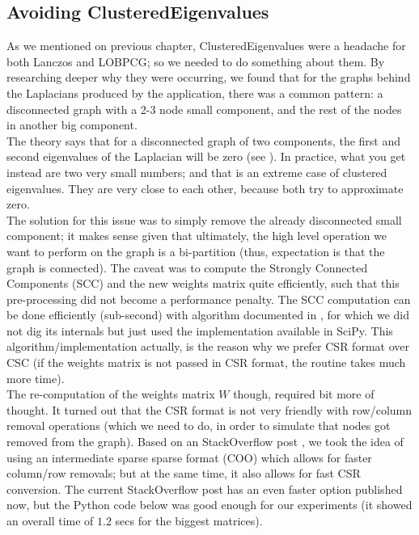 \subsection{Avoiding \gls{ClusteredEigenvalues}}
\label{sub:avoid-clust-eigv}

As we mentioned on previous chapter, \gls{ClusteredEigenvalues} were a
headache for both Lanczos and LOBPCG; so we needed to do something
about them. By researching deeper why they were occurring, we found
that for the graphs behind the \gls{Laplacian}s produced by the
application, there was a common pattern: a disconnected graph with a
2-3 node small component, and the rest of the nodes in another big
component. \\

The theory says that for a disconnected graph of two components, the
first and second eigenvalues of the \gls{Laplacian} will be zero (see
\cite{luxburg07}). In practice, what you get instead are two very
small numbers; and that is an extreme case of clustered
eigenvalues. They are very close to each other, because both try to
approximate zero. \\

The solution for this issue was to simply remove the already
disconnected small component; it makes sense given that ultimately,
the high level operation we want to perform on the graph is a
bi-partition (thus, expectation is that the graph is connected). The
caveat was to compute the Strongly Connected Components (\gls{SCC}) and the
new weights matrix quite efficiently, such that this pre-processing
did not become a performance penalty. The \gls{SCC} computation can be done
efficiently (sub-second) with algorithm documented in \cite{pearce05},
for which we did not dig its internals but just used the
implementation available in SciPy. This  
algorithm/implementation actually, is the reason why we prefer CSR
format over CSC (if the weights matrix is not passed in CSR format,
the routine takes much more time). \\

The re-computation of the weights matrix $W$ though, required bit more
of thought. It turned out that the CSR format is not very friendly
with row/column removal operations (which we need to do, in order to
simulate that nodes got removed from the graph). Based on an
StackOverflow post \cite{alim15}, we took the idea of using an
intermediate sparse sparse format (COO) which allows for faster
column/row removals; but at the same time, it also allows for fast CSR
conversion. The current StackOverflow post has an even faster option
published now, but the Python code below was good enough for our
experiments (it showed an overall time of $1.2$ secs for the biggest
matrices). \\

